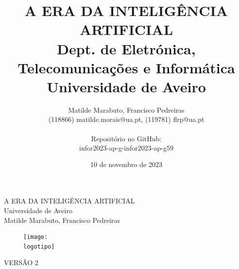 \documentclass{report}
\begin{document}

\def\titulo{A ERA DA INTELIGÊNCIA ARTIFICIAL}
\def\data{10 de novembro de 2023}
\def\repositorio{Repositório no GitHub: \\ infor2023-ap-g-infor2023-ap-g59}
\def\autores{Matilde Marabuto, Francisco Pedreiras}
\def\autorescontactos{(118866) matilde.morais@ua.pt, (119781) flrp@ua.pt}
\def\versao{VERSÃO 2}
\def\departamento{Dept. de Eletrónica, Telecomunicações e Informática}
\def\empresa{Universidade de Aveiro}
\def\logotipo{ua.pdf}
%
%
\begin{titlepage}

\begin{center}
%
\vspace*{50mm}
%
{\Huge \titulo}\\
%
\vspace{10mm}
%
{\Large \empresa}\\
%
\vspace{10mm}
%
{\LARGE \autores}\\ 
%
\vspace{30mm}
%
\begin{figure}[h]
\center
\texttt{[image: \\logotipo]}
\end{figure}
%
\vspace{30mm}
\end{center}
%
\begin{flushright}
\versao
\end{flushright}
\end{titlepage}

\title{%
{\Huge\textbf{\titulo}}\\
{\Large \departamento\\ \empresa\\}
}
%
\author{%
    \autores \\
    \autorescontactos \\ \\
    \repositorio
}
%
%
\date{10 de novembro de 2023}
%
\maketitle

\end{document}

